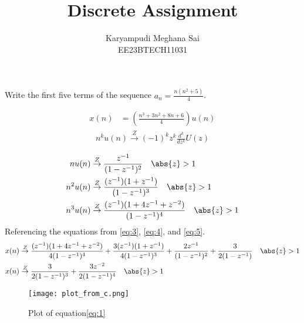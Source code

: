 \documentclass[journal,12pt,onecolumn]{IEEEtran}
\newcommand{\system}[1]{\stackrel{#1}{\rightarrow}}
\theoremstyle{remark}
\begin{document}
\let\vec\mathbf







\bigskip

\renewcommand{\thefigure}{\theenumi}
\renewcommand{\thetable}{\theenumi}


\title{Discrete Assignment}
\author{Karyampudi Meghana Sai\\ EE23BTECH11031}
\maketitle


Write the first five terms of the sequence \(a_n = \frac{n(n^2+5)}{4}\).

\solution
\begin{align}
 x(n) &= \left(\frac{n^3+3n^2+8n+6}{4}\right) u(n)\label{eq:1}
\end{align}
\begin{align}
 n^k u(n) \system{Z} (-1)^k z^k \frac{d^k}{dz^k}U(z)
\end{align}

\begin{align}
    nu(n) &\system{Z} \frac{z^{-1}}{(1 - z^{-1})^2} \quad \abs{ z} > 1  \label{eq:3} \\
    n^2u(n) &\system{Z} \frac{(z^{-1})(1+z^{-1})}{(1 - z^{-1})^3} \quad \abs{ z} > 1  \label{eq:4} \\
    n^3u(n) &\system{Z} \frac{(z^{-1})(1+4z^{-1}+z^{-2})}{(1 - z^{-1})^4} \quad \abs{ z} > 1  \label{eq:5} 
\end{align}
Referencing the equations from \eqref{eq:3}, \eqref{eq:4}, and \eqref{eq:5}.
\begin{align}
    x(n) &\system{Z} \frac{(z^{-1})(1+4z^{-1}+z^{-2})}{4(1-z^{-1})^4} + \frac{3(z^{-1})(1+z^{-1})}{4(1-z^{-1})^3} + \frac{2z^{-1}}{(1 - z^{-1})^2} + \frac{3}{2(1- z^{-1})} \quad \abs{ z} > 1  \label{eq:6} \\
    x(n) &\system{Z} \frac{3}{2(1-z^{-1})^3} + \frac{3z^{-2}}{2(1-z^{-1})^4}\quad \abs{ z} > 1  \label{eq:} 
\end{align}

\begin{figure}[h]
    \centering
    \texttt{[image: plot\_from\_c.png]}
    \caption{Plot of equation\eqref{eq:1}}
    \label{fig:}
\end{figure}
\end{document}
